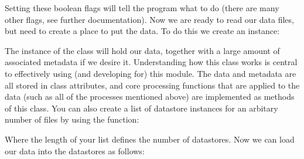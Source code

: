 \documentclass[a4paper,10pt,english]{sphinxmanual}
\begin{document}
\sphinxAtStartPar
Setting these boolean flags will tell the program what to do (there are many other flags, see further documentation). Now we are ready to read our data files, but need to create a place to put the data. To do this we create an  instance:

\begin{sphinxVerbatim}[commandchars=\\\{\}]
  
\end{sphinxVerbatim}

\sphinxAtStartPar
The instance  of the  class will hold our data, together with a large amount of associated metadata if we desire it. Understanding how this class works is central to effectively using (and developing for) this module. The data and metadata are all stored in class attributes, and core processing functions that are applied to the data (such as all of the processes mentioned above) are implemented as methods of this class. You can also create a list of datastore instances for an arbitary number of files by using the function:

\begin{sphinxVerbatim}[commandchars=\\\{\}]
  
\end{sphinxVerbatim}

\sphinxAtStartPar
Where the length of your  list defines the number of datastores. Now we can load our data into the datastores as follows:

\begin{sphinxVerbatim}[commandchars=\\\{\}]
 \PYG{p}{[}\PYG{p}{]}  
 \PYG{p}{[}\PYG{p}{]}  
 \PYG{p}{[}\PYG{p}{]}  
 \PYG{p}{[}\PYG{p}{]}  
\end{sphinxVerbatim}
\end{document}
